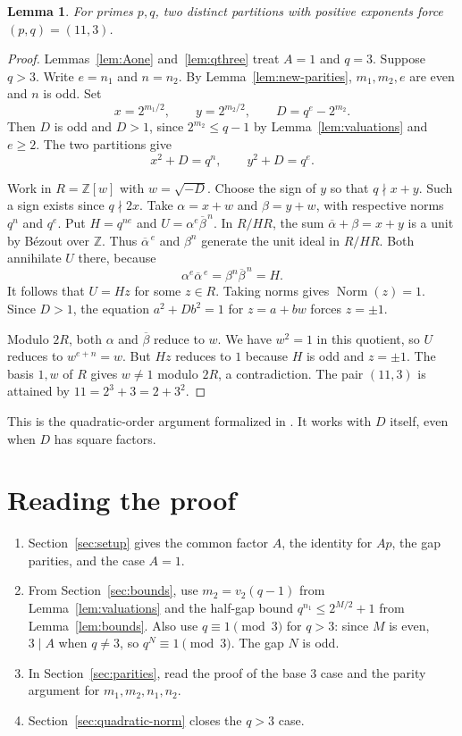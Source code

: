 \documentclass[11pt]{article}
\newtheorem{lemma}{Lemma}
\begin{document}
\begin{lemma}\label{lem:quadratic-norm}
For primes $p,q$, two distinct partitions with positive exponents
force $(p,q)=(11,3)$.
\end{lemma}
\begin{proof}
Lemmas~\ref{lem:Aone} and~\ref{lem:qthree} treat $A=1$ and $q=3$.
Suppose $q>3$. Write $e=n_1$ and $n=n_2$. By
Lemma~\ref{lem:new-parities}, $m_1,m_2,e$ are even and $n$ is odd. Set
\[
x=2^{m_1/2},\qquad y=2^{m_2/2},\qquad D=q^e-2^{m_2}.
\]
Then $D$ is odd and $D>1$, since $2^{m_2}\le q-1$ by
Lemma~\ref{lem:valuations} and $e\ge2$. The two partitions give
\[
x^2+D=q^n,\qquad y^2+D=q^e.
\]

Work in $R=\mathbb Z[w]$ with $w=\sqrt{-D}$. Choose the sign of $y$
so that $q\nmid x+y$. Such a sign exists since $q\nmid2x$. Take
$\alpha=x+w$ and $\beta=y+w$, with respective norms $q^n$ and $q^e$.
Put $H=q^{ne}$ and $U=\alpha^e\overline\beta^{\,n}$.
In $R/HR$, the sum $\overline\alpha+\beta=x+y$ is a unit by
Bézout over $\mathbb Z$. Thus $\overline\alpha^{\,e}$ and
$\beta^n$ generate the unit ideal in $R/HR$. Both annihilate $U$
there, because
\[
\alpha^e\overline\alpha^{\,e}=\beta^n\overline\beta^{\,n}=H.
\]
It follows that $U=Hz$ for some $z\in R$. Taking norms gives
$\operatorname{Norm}(z)=1$. Since $D>1$, the equation
$a^2+Db^2=1$ for $z=a+bw$ forces $z=\pm1$.

Modulo $2R$, both $\alpha$ and $\overline\beta$ reduce to $w$.
We have $w^2=1$ in this quotient, so $U$ reduces to $w^{e+n}=w$.
But $Hz$ reduces to $1$ because $H$ is odd and $z=\pm1$.
The basis $1,w$ of $R$ gives $w\ne1$ modulo $2R$, a contradiction.
The pair $(11,3)$ is attained by $11=2^3+3=2+3^2$.
\end{proof}

This is the quadratic-order argument formalized in .
It works with $D$ itself, even when $D$ has square factors.

\section{Reading the proof}
\label{sec:proof-reading}

\begin{enumerate}
\item Section~\ref{sec:setup} gives the common factor $A$, the
identity for $Ap$, the gap parities, and the case $A=1$.
\item From Section~\ref{sec:bounds}, use $m_2=v_2(q-1)$ from
Lemma~\ref{lem:valuations} and the half-gap bound
$q^{n_1}\le2^{M/2}+1$ from Lemma~\ref{lem:bounds}.
Also use $q\equiv1\pmod3$ for $q>3$: since $M$ is even,
$3\mid A$ when $q\ne3$, so $q^N\equiv1\pmod3$. The gap $N$ is odd.
\item In Section~\ref{sec:parities}, read the proof of the base
$3$ case and the parity argument for $m_1,m_2,n_1,n_2$.
\item Section~\ref{sec:quadratic-norm} closes the $q>3$ case.
\end{enumerate}
\end{document}
